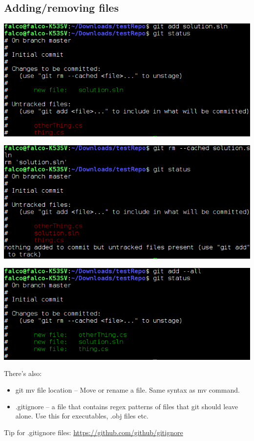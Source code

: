 \documentclass[10pt,a4paper]{beamer}
\begin{document}
\subsection{Adding/removing files}
\begin{frame}
\includegraphics[width=\linewidth]{gitAdd.png}
\end{frame}

\begin{frame}
\includegraphics[width=\linewidth]{gitrmcached.png}
\end{frame}

\begin{frame}
\includegraphics[width=\linewidth]{gitaddall.png}
\end{frame}

\begin{frame}
There's also:
\begin{itemize}
\item git mv file location -- Move or rename a file. Same syntax as mv command.
\item .gitignore -- a file that contains regex patterns of files that git should leave alone. Use this for executables, .obj files etc.
\end{itemize}
Tip for .gitignore files:
\url{https://github.com/github/gitignore}
\end{frame}
\end{document}
